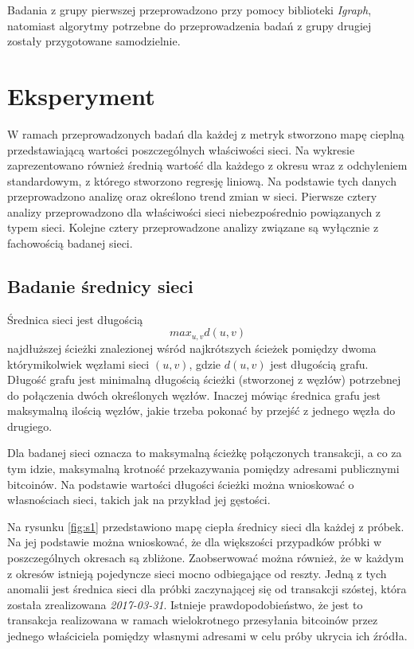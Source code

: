 \documentclass[12pt, twoside, final, openany]{mgr}
\begin{document}
\indent Badania z grupy pierwszej przeprowadzono przy pomocy biblioteki \textit{Igraph}, natomiast algorytmy potrzebne do przeprowadzenia badań z grupy drugiej zostały przygotowane samodzielnie.

\section{Eksperyment}
W ramach przeprowadzonych badań dla każdej z metryk stworzono mapę cieplną przedstawiającą wartości poszczególnych właściwości sieci. Na wykresie zaprezentowano również średnią wartość dla każdego z okresu wraz z odchyleniem standardowym, z którego stworzono regresję liniową. Na podstawie tych danych przeprowadzono analizę oraz określono trend zmian w sieci. Pierwsze cztery analizy przeprowadzono dla właściwości sieci niebezpośrednio powiązanych z typem sieci. Kolejne cztery przeprowadzone analizy związane są wyłącznie z fachowością badanej sieci.

\subsection{Badanie średnicy sieci}
\label{srednica_sieci}
\indent Średnica sieci jest długością 
\begin{equation}
\label{eq:srednica_sieci}
	max_{u,v}d(u,v)
\end{equation}
najdłuższej ścieżki znalezionej wśród najkrótszych ścieżek pomiędzy dwoma którymikolwiek węzłami sieci $(u,v)$, gdzie $d(u,v)$ jest długością grafu. Długość grafu jest minimalną długością ścieżki (stworzonej z węzłów) potrzebnej do połączenia dwóch określonych węzłów. Inaczej mówiąc średnica grafu jest maksymalną ilością węzłów, jakie trzeba pokonać by przejść z jednego węzła do drugiego.

\indent Dla badanej sieci oznacza to maksymalną ścieżkę połączonych transakcji, a co za tym idzie, maksymalną krotność przekazywania pomiędzy adresami publicznymi bitcoinów. Na podstawie wartości długości ścieżki można wnioskować o własnościach sieci, takich jak na przykład jej gęstości.

\indent Na rysunku \ref{fig:s1} przedstawiono mapę ciepła średnicy sieci dla każdej z próbek. Na jej podstawie można wnioskować, że dla większości przypadków próbki w poszczególnych okresach są zbliżone. Zaobserwować można również, że w każdym z okresów istnieją pojedyncze sieci mocno odbiegające od reszty. Jedną z tych anomalii jest średnica sieci dla próbki zaczynającej się od transakcji szóstej, która została zrealizowana \textit{2017-03-31}. Istnieje prawdopodobieństwo, że jest to transakcja realizowana w ramach wielokrotnego przesyłania bitcoinów przez jednego właściciela pomiędzy własnymi adresami w celu próby ukrycia ich źródła.
\end{document}
